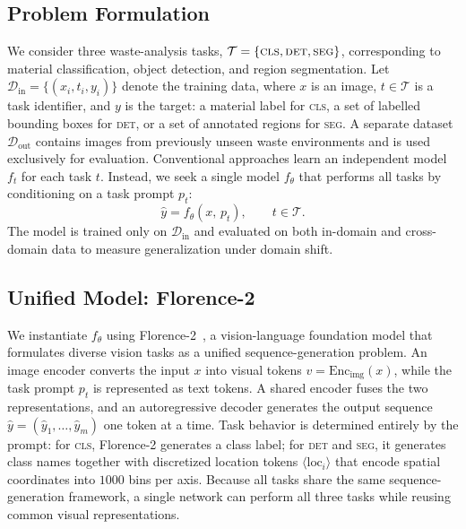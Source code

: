 \documentclass[conference]{IEEEtran}
\begin{document}
\subsection{Problem Formulation}
We consider three waste-analysis tasks,
$\mathcal{T}=\{\textsc{cls},\textsc{det},\textsc{seg}\}$,
corresponding to material classification, object detection, and region segmentation.
Let $\mathcal{D}_{\text{in}}=\{(x_i,t_i,y_i)\}$ denote the training data, where
$x$ is an image, $t\in\mathcal{T}$ is a task identifier, and $y$ is the target:
a material label for \textsc{cls}, a set of labelled bounding boxes for \textsc{det},
or a set of annotated regions for \textsc{seg}. A separate dataset
$\mathcal{D}_{\text{out}}$ contains images from previously unseen waste environments
and is used exclusively for evaluation. Conventional approaches learn an independent
model $f_t$ for each task $t$. Instead, we seek a single model $f_\theta$ that
performs all tasks by conditioning on a task prompt $p_t$:
\begin{equation}
\hat{y} = f_\theta(x,\,p_t), \qquad t\in\mathcal{T}.
\label{eq:unified}
\end{equation}
The model is trained only on $\mathcal{D}_{\text{in}}$ and evaluated on both
in-domain and cross-domain data to measure generalization under domain shift.

\subsection{Unified Model: Florence-2}
We instantiate $f_\theta$ using Florence-2~\cite{florence2}, a vision-language
foundation model that formulates diverse vision tasks as a unified
sequence-generation problem. An image encoder converts the input $x$ into visual
tokens $v=\mathrm{Enc}_{\text{img}}(x)$, while the task prompt $p_t$ is represented
as text tokens. A shared encoder fuses the two representations, and an autoregressive
decoder generates the output sequence $\hat{y}=(\hat{y}_1,\ldots,\hat{y}_m)$ one
token at a time. Task behavior is determined entirely by the prompt: for
\textsc{cls}, Florence-2 generates a class label; for \textsc{det} and \textsc{seg},
it generates class names together with discretized location tokens
$\langle\text{loc}_i\rangle$ that encode spatial coordinates into $1000$ bins per
axis. Because all tasks share the same sequence-generation framework, a single
network can perform all three tasks while reusing common visual representations.
\end{document}
